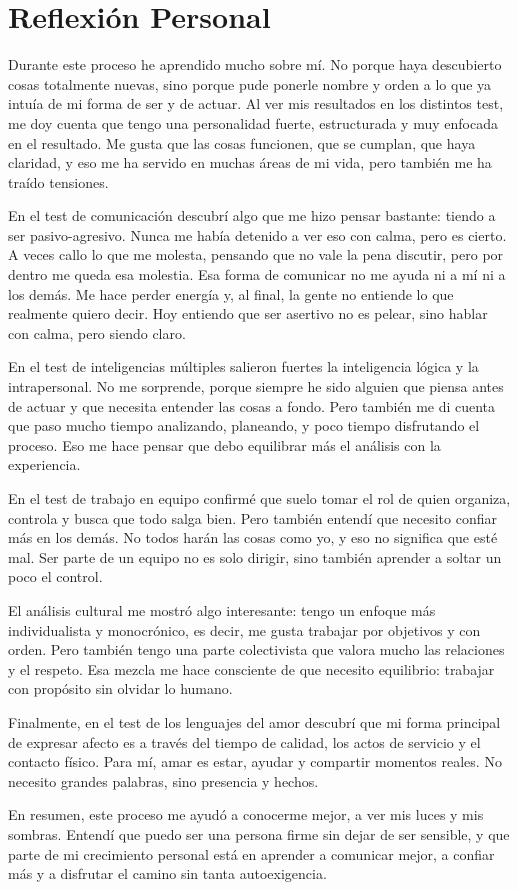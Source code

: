 \chapter{Reflexión Personal}
Durante este proceso he aprendido mucho sobre mí. No porque haya descubierto cosas totalmente nuevas, sino porque pude ponerle nombre y orden a lo que ya intuía de mi forma de ser y de actuar. Al ver mis resultados en los distintos test, me doy cuenta que tengo una personalidad fuerte, estructurada y muy enfocada en el resultado. Me gusta que las cosas funcionen, que se cumplan, que haya claridad, y eso me ha servido en muchas áreas de mi vida, pero también me ha traído tensiones.

En el test de comunicación descubrí algo que me hizo pensar bastante: tiendo a ser pasivo-agresivo. Nunca me había detenido a ver eso con calma, pero es cierto. A veces callo lo que me molesta, pensando que no vale la pena discutir, pero por dentro me queda esa molestia. Esa forma de comunicar no me ayuda ni a mí ni a los demás. Me hace perder energía y, al final, la gente no entiende lo que realmente quiero decir. Hoy entiendo que ser asertivo no es pelear, sino hablar con calma, pero siendo claro.

En el test de inteligencias múltiples salieron fuertes la inteligencia lógica y la intrapersonal. No me sorprende, porque siempre he sido alguien que piensa antes de actuar y que necesita entender las cosas a fondo. Pero también me di cuenta que paso mucho tiempo analizando, planeando, y poco tiempo disfrutando el proceso. Eso me hace pensar que debo equilibrar más el análisis con la experiencia.

En el test de trabajo en equipo confirmé que suelo tomar el rol de quien organiza, controla y busca que todo salga bien. Pero también entendí que necesito confiar más en los demás. No todos harán las cosas como yo, y eso no significa que esté mal. Ser parte de un equipo no es solo dirigir, sino también aprender a soltar un poco el control.

El análisis cultural me mostró algo interesante: tengo un enfoque más individualista y monocrónico, es decir, me gusta trabajar por objetivos y con orden. Pero también tengo una parte colectivista que valora mucho las relaciones y el respeto. Esa mezcla me hace consciente de que necesito equilibrio: trabajar con propósito sin olvidar lo humano.

Finalmente, en el test de los lenguajes del amor descubrí que mi forma principal de expresar afecto es a través del tiempo de calidad, los actos de servicio y el contacto físico. Para mí, amar es estar, ayudar y compartir momentos reales. No necesito grandes palabras, sino presencia y hechos.

En resumen, este proceso me ayudó a conocerme mejor, a ver mis luces y mis sombras. Entendí que puedo ser una persona firme sin dejar de ser sensible, y que parte de mi crecimiento personal está en aprender a comunicar mejor, a confiar más y a disfrutar el camino sin tanta autoexigencia.